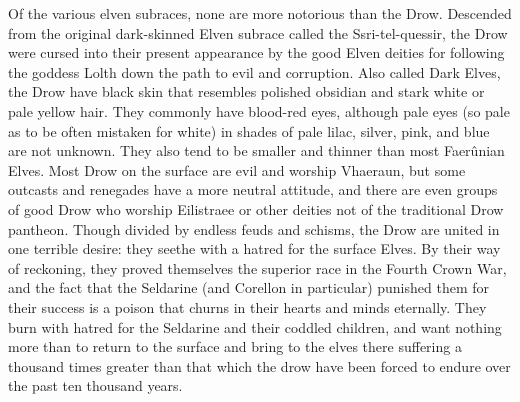 
Of the various elven subraces, none are more notorious than the Drow. Descended from the original dark-skinned Elven subrace called the Ssri-tel-quessir, the Drow were cursed into their present appearance by the good Elven deities for following the goddess Lolth down the path to evil and corruption. Also called Dark Elves, the Drow have black skin that resembles polished obsidian and stark white or pale yellow hair. They commonly have blood-red eyes, although pale eyes (so pale as to be often mistaken for white) in shades of pale lilac, silver, pink, and blue are not unknown. They also tend to be smaller and thinner than most Faerûnian Elves. Most Drow on the surface are evil and worship Vhaeraun, but some outcasts and renegades have a more neutral attitude, and there are even groups of good Drow who worship Eilistraee or other deities not of the traditional Drow pantheon. Though divided by endless feuds and schisms, the Drow are united in one terrible desire: they seethe with a hatred for the surface Elves. By their way of reckoning, they proved themselves the superior race in the Fourth Crown War, and the fact that the Seldarine (and Corellon in particular) punished them for their success is a poison that churns in their hearts and minds eternally. They burn with hatred for the Seldarine and their coddled children, and want nothing more than to return to the surface and bring to the elves there suffering a thousand times greater than that which the drow have been forced to endure over the past ten thousand years.

